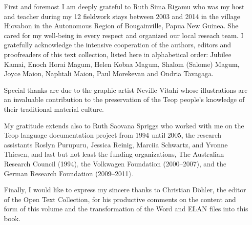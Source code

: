 \addchap{\lsAcknowledgementTitle} 
\markdouble{\lsAcknowledgementTitle}

First and foremost I am deeply grateful to Ruth Sima Rigamu who was my host and teacher during my 12 fieldwork stays between 2003 and 2014 in the village Hiovabon in the Autonomous Region of Bougainville, Papua New Guinea. She cared for my well-being in every respect and organized our local reseach team. I gratefully acknowledge the intensive cooperation of the authors, editors and proofreaders of this text collection, listed here in alphabetical order: Jubilee Kamai, Enoch Horai Magum, Helen Kobaa Magum, Shalom (Salome) Magum, Joyce Maion, Naphtali Maion, Paul Morekevan and Ondria Tavagaga.

Special thanks are due to the graphic artist Neville Vitahi whose illustrations are an invaluable contribution to the preservation of the Teop people’s knowledge of their traditional material culture.

My gratitude extends also to Ruth Saovana Spriggs who worked with me on the Teop language documentation project from 1994 until 2005, the research assistants Roslyn Purupuru, Jessica Reinig, Marciia Schwartz, and Yvonne Thiesen, and last but not least the funding organizations, The Australian Research Council (1994), the Volkwagen Foundation (2000--2007), and the German Research Foundation (2009--2011).

Finally, I would like to express my sincere thanks to Christian Döhler, the editor of the Open Text Collection, for his productive comments on the content and form of this volume and the transformation of the Word and ELAN files into this book.